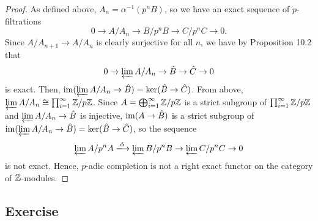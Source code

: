 \begin{proof}
As defined above, $A_n = \alpha^{-1}(p^nB)$, so we have an exact sequence of $p$-filtrations
$$0 \to A/A_n \to B/p^n B \to C/p^n C \to 0.$$
Since $A/A_{n+1} \to A/A_n$ is clearly surjective for all $n$, we have by Proposition 10.2 that
$$0 \to \varprojlim A/A_n \to \hat B \to \hat C \to 0$$
is exact. Then, $\operatorname{im}(\varprojlim A/A_n \to \hat B) = \ker(\hat B \to \hat C)$. From above, $\varprojlim A/A_n \cong \prod_{i=1}^{\infty}\mathbb{Z}/p\mathbb{Z}$.
Since $A = \bigoplus_{i=1}^{\infty}\mathbb{Z}/p\mathbb{Z}$ is a strict subgroup of $\prod_{i=1}^{\infty}\mathbb{Z}/p\mathbb{Z}$ and $\varprojlim A/A_n \to \hat B$ is injective,
$\operatorname{im}(A \to \hat B)$ is a strict subgroup of $\operatorname{im}(\varprojlim A/A_n \to \hat B) = \ker(\hat B \to \hat C)$, so the sequence
$$\varprojlim A/p^n A \xlongrightarrow{\hat \alpha} \varprojlim B/p^n B \to \varprojlim C/p^n C \to 0$$
is not exact. Hence, $p$-adic completion is not a right exact functor on the category of $\mathbb{Z}$-modules.
\end{proof}

\subsection{Exercise}\label{10.2}

